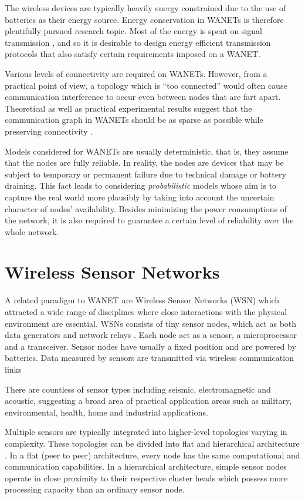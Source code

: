 The wireless devices are typically heavily energy constrained due to the use of batteries as their energy source.
Energy conservation in WANETs is therefore plentifully pursued research topic.
Most of the energy is spent on signal transmission \cite{halgamuge09}, 
and so it is desirable to design energy efficient transmission protocols that also satisfy certain requirements imposed on a WANET.

Various levels of connectivity are required on WANETs.
However, from a practical point of view, a topology which is ``too connected'' would often cause communication interference to occur even between nodes that are fart apart.
Theoretical as well as practical experimental results suggest that the communication graph in WANETs should be as sparse as possible while preserving connectivity \cite{blough02}.

Models considered for WANETs are usually deterministic, that is, they assume that the nodes are fully reliable. 
In reality, the nodes are devices that may be subject to temporary or permanent failure due to technical damage or battery draining.
This fact leads to considering \emph{probabilistic} models whose aim is to capture the real world more plausibly by taking into account the uncertain character of nodes' availability.
Besides minimizing the power consumptions of the network, it is also required to guarantee a certain level of reliability over the whole network.

\section{Wireless Sensor Networks}

A related paradigm to WANET are Wireless Sensor Networks (WSN) which attracted a wide range of disciplines where close interactions with the physical environment are essential.
WSNs consists of tiny sensor nodes, which act as both data generators and network relays \cite{akyildiz10}.
Each node act as a senosr, a microprocessor and a transceiver.
Sensor nodes have usually a fixed position and are powered by batteries.
Data measured  by sensors are transmitted via wireless communication links

There are countless of sensor types including seismic, electromagnetic and acoustic, suggesting a broad area of practical application areas such as 
military, environmental, health, home and industrial applications.

Multiple sensors are typically integrated into higher-level topologies varying in complexity.
These topologies can be divided into flat and hierarchical architecture \cite{mcgrath13}.
In a flat (peer to peer) architecture, every node has the same computational and communication capabilities.
In a hierarchical architecture, simple sensor nodes operate in close proximity to their respective cluster heads which possess more processing capacity than an ordinary sensor node.

